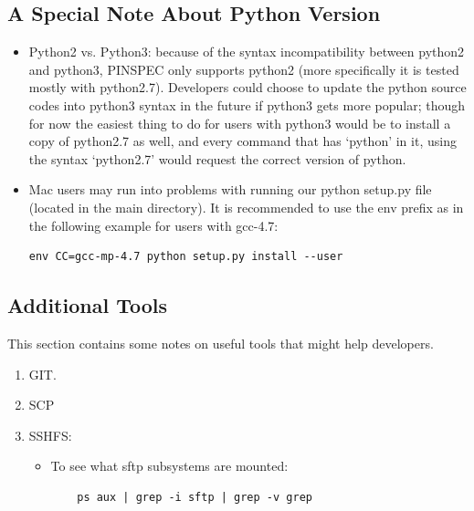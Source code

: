 \documentclass[titlepage]{article}
\begin{document}
\clearpage
\subsection{A Special Note About Python Version}
\begin{itemize}
\item Python2 vs. Python3: because of the syntax incompatibility between python2 and python3, PINSPEC only supports python2 (more specifically it is tested mostly with python2.7). Developers could choose to update the python source codes into python3 syntax in the future if python3 gets more popular; though for now the easiest thing to do for users with python3 would be to install a copy of python2.7 as well, and every command that has `python' in it, using the syntax `python2.7' would request the correct version of python. 

\item Mac users may run into problems with running our python setup.py file (located in the main directory). It is recommended to use the env prefix as in the following example for users with gcc-4.7:
\begin{verbatim}
env CC=gcc-mp-4.7 python setup.py install --user
\end{verbatim}
\end{itemize}

\clearpage
\subsection{Additional Tools}
This section contains some notes on useful tools that might help developers. 
\begin{enumerate}
\item GIT. 

\item SCP

\item SSHFS: 
\begin{itemize}

\item To see what sftp subsystems are mounted: 
\begin{verbatim}
    ps aux | grep -i sftp | grep -v grep
\end{verbatim}


\end{itemize}

\end{enumerate}
\end{document}
